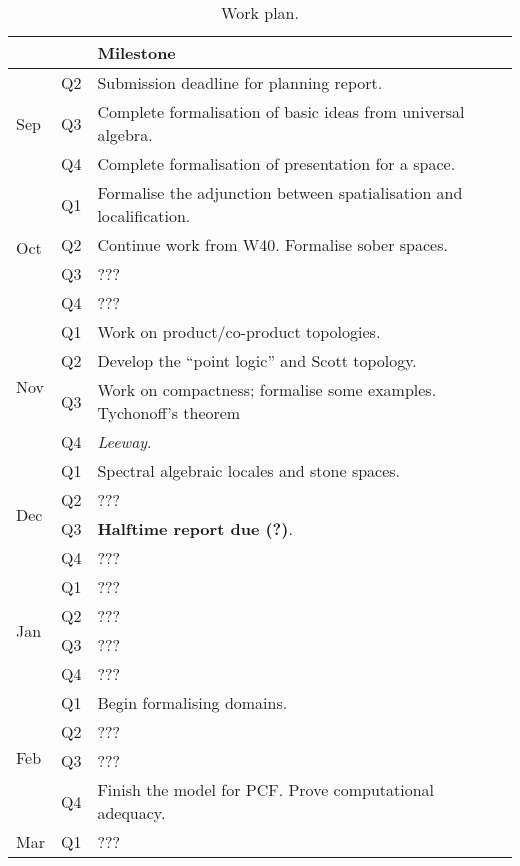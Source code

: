 \documentclass{article}
\begin{document}
\begin{table}[]\caption{Work plan.}\label{table:plan}
\begin{tabular}{lll}
                     &     & Milestone \\\hline \hline
\multirow{3}{*}{Sep} & Q2  & Submission deadline for planning report. \\
                     & Q3  & Complete formalisation of basic ideas from universal algebra. \\
                     & Q4  & Complete formalisation of presentation for a space. \\ \hline
\multirow{4}{*}{Oct} & Q1  & Formalise the adjunction between spatialisation and localification. \\
                     & Q2  & Continue work from W40. Formalise sober spaces. \\
                     & Q3  & ??? \\
                     & Q4  & ??? \\ \hline
\multirow{4}{*}{Nov} & Q1  & Work on product/co-product topologies. \\
                     & Q2  & Develop the ``point logic'' and Scott topology. \\
                     & Q3  & Work on compactness; formalise some examples. Tychonoff's theorem \\
                     & Q4  & \emph{Leeway}. \\ \hline
\multirow{4}{*}{Dec} & Q1  & Spectral algebraic locales and stone spaces. \\
                     & Q2  & ??? \\
                     & Q3  & \textbf{Halftime report due (?)}. \\
                     & Q4  & ??? \\ \hline
\multirow{4}{*}{Jan} & Q1  & ??? \\
                     & Q2  & ??? \\
                     & Q3  & ??? \\
                     & Q4  & ??? \\ \hline
\multirow{4}{*}{Feb} & Q1  & Begin formalising domains. \\
                     & Q2  & ??? \\
                     & Q3  & ??? \\
                     & Q4  & Finish the model for PCF. Prove computational adequacy. \\ \hline
\multirow{4}{*}{Mar} & Q1  & ??? \\

\end{tabular}
\end{table}
\end{document}
